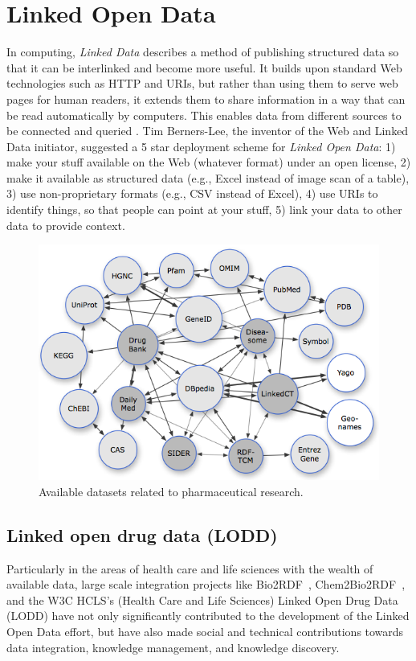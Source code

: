 \documentclass[conference]{IEEEtran}
\begin{document}
\section{Linked Open Data}
\label{sec:lod}
In computing, \emph{Linked Data} describes a method of publishing structured data so that it can be interlinked and become more useful.
It builds upon standard Web technologies such as HTTP and URIs, but rather than using them to serve web pages for human readers, it extends them to share information in a way that can be read automatically by computers.
This enables data from different sources to be connected and queried \cite{linkeddata}.
Tim Berners-Lee, the inventor of the Web and Linked Data initiator, suggested a 5 star deployment scheme for \emph{Linked Open Data}:
1) make your stuff available on the Web (whatever format) under an open license,
2) make it available as structured data (e.g., Excel instead of image scan of a table),
3) use non-proprietary formats (e.g., CSV instead of Excel),
4) use URIs to identify things, so that people can point at your stuff,
5) link your data to other data to provide context.

\begin{figure}[tb]
	\centering
		\includegraphics[width=1.0\columnwidth]{images/lod_cloud.png}
	\caption{Available datasets related to pharmaceutical research.}
	\label{fig:lod}
\end{figure}

\subsection{Linked open drug data (LODD)}
Particularly in the areas of health care and life sciences with the wealth of available data, large scale integration projects like Bio2RDF~\cite{bio2rdf}, Chem2Bio2RDF~\cite{chembio}, and the W3C HCLS’s (Health Care and Life Sciences) Linked Open Drug Data (LODD)\cite{lodd} have not only significantly contributed to the development of the Linked Open Data effort, but have also made social and technical contributions towards data integration, knowledge management, and knowledge discovery.
\end{document}
